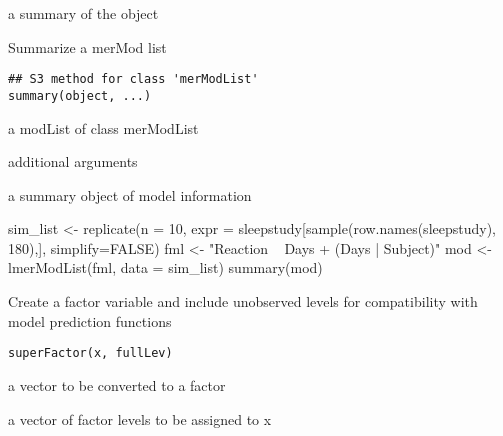 \documentclass[letterpaper]{book}
\begin{document}
%
\begin{Value}
a summary of the object
\end{Value}
%
\begin{Description}\relax
Summarize a merMod list
\end{Description}
%
\begin{Usage}
\begin{verbatim}
## S3 method for class 'merModList'
summary(object, ...)
\end{verbatim}
\end{Usage}
%
\begin{Arguments}
\begin{ldescription}
\item[\code{object}] a modList of class merModList

\item[\code{...}] additional arguments
\end{ldescription}
\end{Arguments}
%
\begin{Value}
a summary object of model information
\end{Value}
%
\begin{Examples}
\begin{ExampleCode}
sim_list <- replicate(n = 10,
        expr = sleepstudy[sample(row.names(sleepstudy), 180),],
        simplify=FALSE)
fml <- "Reaction ~ Days + (Days | Subject)"
mod <- lmerModList(fml, data = sim_list)
summary(mod)
\end{ExampleCode}
\end{Examples}
%
\begin{Description}\relax
Create a factor variable and include unobserved levels
for compatibility with model prediction functions
\end{Description}
%
\begin{Usage}
\begin{verbatim}
superFactor(x, fullLev)
\end{verbatim}
\end{Usage}
%
\begin{Arguments}
\begin{ldescription}
\item[\code{x}] a vector to be converted to a factor

\item[\code{fullLev}] a vector of factor levels to be assigned to x
\end{ldescription}
\end{Arguments}
\end{document}
